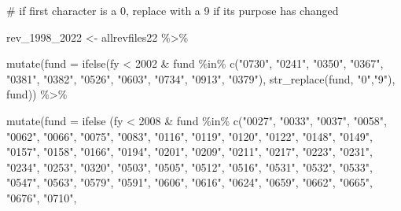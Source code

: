 \documentclass[
  letterpaper,
  DIV=11,
  numbers=noendperiod]{scrreport}
\newenvironment{Shaded}{\begin{snugshade}}{\end{snugshade}}
\newcommand{\AttributeTok}[1]{\textcolor[rgb]{0.40,0.45,0.13}{#1}}
\newcommand{\CommentTok}[1]{\textcolor[rgb]{0.37,0.37,0.37}{#1}}
\newcommand{\DecValTok}[1]{\textcolor[rgb]{0.68,0.00,0.00}{#1}}
\newcommand{\FunctionTok}[1]{\textcolor[rgb]{0.28,0.35,0.67}{#1}}
\newcommand{\NormalTok}[1]{\textcolor[rgb]{0.00,0.23,0.31}{#1}}
\newcommand{\OtherTok}[1]{\textcolor[rgb]{0.00,0.23,0.31}{#1}}
\newcommand{\SpecialCharTok}[1]{\textcolor[rgb]{0.37,0.37,0.37}{#1}}
\newcommand{\StringTok}[1]{\textcolor[rgb]{0.13,0.47,0.30}{#1}}
\begin{document}
\begin{Shaded}
\begin{Highlighting}[]
\CommentTok{\# if first character is a 0, replace with a 9 if its purpose has changed}

\NormalTok{rev\_1998\_2022 }\OtherTok{\textless{}{-}}\NormalTok{ allrevfiles22 }\SpecialCharTok{\%\textgreater{}\%}

      \FunctionTok{mutate}\NormalTok{(}\AttributeTok{fund =} \FunctionTok{ifelse}\NormalTok{(fy }\SpecialCharTok{\textless{}} \DecValTok{2002} \SpecialCharTok{\&}\NormalTok{ fund }\SpecialCharTok{\%in\%} \FunctionTok{c}\NormalTok{(}\StringTok{"0730"}\NormalTok{, }\StringTok{"0241"}\NormalTok{, }\StringTok{"0350"}\NormalTok{, }\StringTok{"0367"}\NormalTok{, }\StringTok{"0381"}\NormalTok{, }\StringTok{"0382"}\NormalTok{, }\StringTok{"0526"}\NormalTok{, }\StringTok{"0603"}\NormalTok{, }\StringTok{"0734"}\NormalTok{, }\StringTok{"0913"}\NormalTok{, }\StringTok{"0379"}\NormalTok{), }\FunctionTok{str\_replace}\NormalTok{(fund, }\StringTok{"0"}\NormalTok{,}\StringTok{"9"}\NormalTok{), fund)) }\SpecialCharTok{\%\textgreater{}\%}
  
  \FunctionTok{mutate}\NormalTok{(}\AttributeTok{fund =} \FunctionTok{ifelse}\NormalTok{ (fy }\SpecialCharTok{\textless{}} \DecValTok{2008} \SpecialCharTok{\&}\NormalTok{ fund }\SpecialCharTok{\%in\%} \FunctionTok{c}\NormalTok{(}\StringTok{"0027"}\NormalTok{, }\StringTok{"0033"}\NormalTok{, }\StringTok{"0037"}\NormalTok{, }\StringTok{"0058"}\NormalTok{, }\StringTok{"0062"}\NormalTok{, }\StringTok{"0066"}\NormalTok{, }\StringTok{"0075"}\NormalTok{, }\StringTok{"0083"}\NormalTok{, }\StringTok{"0116"}\NormalTok{, }\StringTok{"0119"}\NormalTok{, }\StringTok{"0120"}\NormalTok{, }\StringTok{"0122"}\NormalTok{, }\StringTok{"0148"}\NormalTok{, }\StringTok{"0149"}\NormalTok{, }\StringTok{"0157"}\NormalTok{, }\StringTok{"0158"}\NormalTok{, }\StringTok{"0166"}\NormalTok{, }\StringTok{"0194"}\NormalTok{, }\StringTok{"0201"}\NormalTok{, }\StringTok{"0209"}\NormalTok{, }\StringTok{"0211"}\NormalTok{, }\StringTok{"0217"}\NormalTok{, }\StringTok{"0223"}\NormalTok{, }\StringTok{"0231"}\NormalTok{, }\StringTok{"0234"}\NormalTok{, }\StringTok{"0253"}\NormalTok{, }\StringTok{"0320"}\NormalTok{, }\StringTok{"0503"}\NormalTok{, }\StringTok{"0505"}\NormalTok{, }\StringTok{"0512"}\NormalTok{, }\StringTok{"0516"}\NormalTok{, }\StringTok{"0531"}\NormalTok{, }\StringTok{"0532"}\NormalTok{, }\StringTok{"0533"}\NormalTok{, }\StringTok{"0547"}\NormalTok{, }\StringTok{"0563"}\NormalTok{, }\StringTok{"0579"}\NormalTok{, }\StringTok{"0591"}\NormalTok{, }\StringTok{"0606"}\NormalTok{, }\StringTok{"0616"}\NormalTok{, }\StringTok{"0624"}\NormalTok{, }\StringTok{"0659"}\NormalTok{, }\StringTok{"0662"}\NormalTok{, }\StringTok{"0665"}\NormalTok{, }\StringTok{"0676"}\NormalTok{, }\StringTok{"0710"}\NormalTok{, }


\end{Highlighting}
\end{Shaded}
\end{document}
